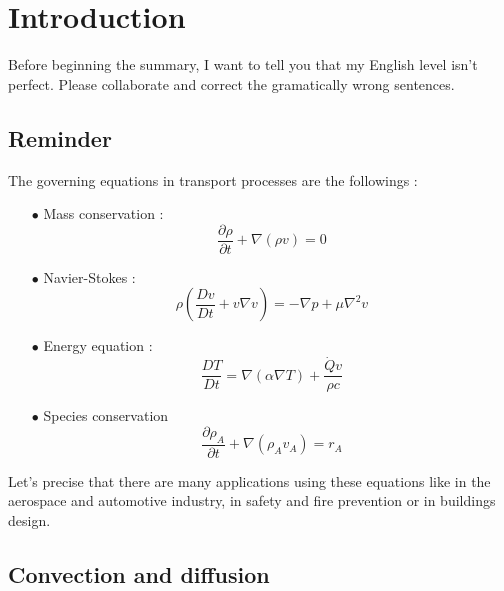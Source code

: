 
\chapter{Introduction}
Before beginning the summary, I want to tell you that my English level isn't perfect. Please collaborate and correct the gramatically wrong sentences.\\

\section{Reminder}
The governing equations in transport processes are the followings :
\begin{itemize}
	\item[$\bullet$] Mass conservation : 
	      \begin{equation}
	      	\frac{\partial \rho}{\partial t} + \nabla (\rho v) = 0
	      \end{equation}
	\item[$\bullet$] Navier-Stokes :
	      \begin{equation}
	      	\rho \left(\frac{Dv}{Dt} + v \nabla v \right) = -\nabla p + \mu \nabla ^2 v
	      \end{equation}		 
	\item[$\bullet$] Energy equation :
	      \begin{equation}
	      	\frac{DT}{Dt} = \nabla (\alpha \nabla T) + \frac{\dot{Q}v}{\rho c}
	      \end{equation}
	\item[$\bullet$] Species conservation
	      \begin{equation}
	      	\frac{\partial \rho _A}{\partial t} + \nabla (\rho _A v_A) = r_A
	      \end{equation}
\end{itemize}
Let's precise that there are many applications using these equations like in the aerospace and automotive industry, in safety and fire prevention or in buildings design.  
	
\section{Convection and diffusion}
